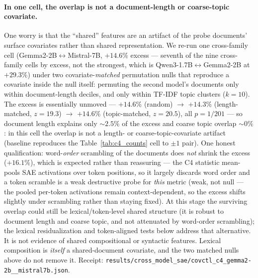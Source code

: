\paragraph{In one cell, the overlap is not a document-length or coarse-topic covariate.}\label{app:lencov} One worry is that the ``shared'' features are an artifact of the probe documents' surface covariates rather than shared representation. We re-run one cross-family cell (Gemma2-2B$\leftrightarrow$Mistral-7B, $+14.6\%$ excess --- seventh of the nine cross-family cells by excess, not the strongest, which is Qwen3-1.7B$\leftrightarrow$Gemma2-2B at $+29.3\%$) under two covariate-\emph{matched} permutation nulls that reproduce a covariate inside the null itself: permuting the second model's documents only within document-length deciles, and only within TF-IDF topic clusters ($k{=}10$). The excess is essentially unmoved --- $+14.6\%$ (random) $\to$ $+14.3\%$ (length-matched, $z{=}19.3$) $\to$ $+14.6\%$ (topic-matched, $z{=}20.5$), all $p{=}1/201$ --- so document length explains only ${\sim}2.5\%$ of the excess and coarse topic overlap ${\sim}0\%$: in this cell the overlap is not a length- or coarse-topic-covariate artifact (baseline reproduces the Table~\ref{tab:c4_counts} cell to $\pm1$ pair). One honest qualification: word-\emph{order} scrambling of the documents does \emph{not} shrink the excess ($+16.1\%$), which is expected rather than reassuring --- the C4 statistic mean-pools SAE activations over token positions, so it largely discards word order and a token scramble is a weak destructive probe for \emph{this} metric (weak, not null --- the pooled per-token activations remain context-dependent, so the excess shifts slightly under scrambling rather than staying fixed). At this stage the surviving overlap could still be lexical/token-level shared structure (it is robust to document length and coarse topic, and not attenuated by word-order scrambling); the lexical residualization and token-aligned tests below address that alternative. It is not evidence of shared compositional or syntactic features. Lexical composition is \emph{itself} a shared-document covariate, and the two matched nulls above do not remove it. Receipt: \texttt{results/cross\_model\_sae/covctl\_c4\_gemma2-2b\_\_mistral7b.json}.

